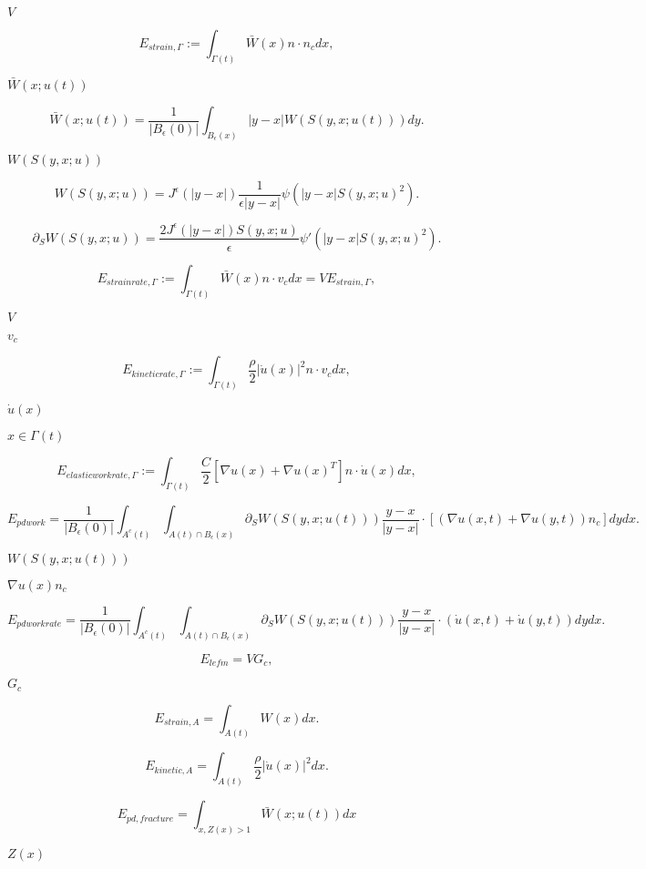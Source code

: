 \documentclass{article}
\begin{document}
$V $
\pagebreak

\[ E_{strain, \Gamma} := \int_{\Gamma(t)} \bar{W}(x) n \cdot n_c dx, \]
\pagebreak

$ \bar{W}(x;u(t)) $
\pagebreak

\[ \bar{W}(x;u(t)) = \frac{1}{|B_\epsilon(0)|} \int_{B_\epsilon(x)} |y-x| W(S(y,x;u(t))) dy.\]
\pagebreak

$ W(S(y,x;u)) $
\pagebreak

\[ W(S(y,x;u)) = J^\epsilon(|y-x|) \frac{1}{\epsilon |y-x|} \psi(|y-x| S(y,x;u)^2). \]
\pagebreak

\[\partial_S W(S(y,x;u)) = \frac{2J^\epsilon(|y-x|) S(y,x;u)}{\epsilon} \psi'(|y-x| S(y,x;u)^2). \]
\pagebreak

\[ E_{strain rate, \Gamma} := \int_{\Gamma(t)}\bar{W}(x) n \cdot v_c dx = V E_{strain, \Gamma}, \]
\pagebreak

$ V$
\pagebreak

$ v_c$
\pagebreak

\[ E_{kinetic rate, \Gamma} := \int_{\Gamma(t)} \frac{\rho}{2} |\dot{u}(x)|^2 n \cdot v_c dx, \]
\pagebreak

$ \dot{u}(x)$
\pagebreak

$ x \in \Gamma (t) $
\pagebreak

\[ E_{elastic work rate, \Gamma} := \int_{\Gamma(t)} \frac{C}{2} [\nabla u (x) + \nabla u(x)^T]n \cdot \dot{u}(x) dx , \]
\pagebreak

\[ E_{pd work} = \frac{1}{|B_\epsilon(0)|} \int_{A^c(t)} \int_{A(t) \cap B_\epsilon(x)} \partial_S W(S(y,x; u(t))) \frac{y-x}{|y-x|} \cdot [(\nabla {u}(x,t) + \nabla {u}(y,t)) n_c] dy dx. \]
\pagebreak

$ W(S(y,x; u(t))) $
\pagebreak

$ \nabla u(x) n_c$
\pagebreak

\[ E_{pd work rate} = \frac{1}{|B_\epsilon(0)|} \int_{A^c(t)} \int_{A(t) \cap B_\epsilon(x)} \partial_S W(S(y,x; u(t))) \frac{y-x}{|y-x|} \cdot (\dot{u}(x,t) + \dot{u}(y,t)) dy dx. \]
\pagebreak

\[ E_{lefm} = V G_c, \]
\pagebreak

$ G_c$
\pagebreak

\[ E_{strain, A} = \int_{A(t)} W(x) dx. \]
\pagebreak

\[ E_{kinetic, A} = \int_{A(t)} \frac{\rho}{2} |\dot{u}(x)|^2 dx. \]
\pagebreak

\[ E_{pd,fracture} = \int_{x, Z(x) > 1} \bar{W}(x;u(t)) dx \]
\pagebreak

$ Z(x) $
\pagebreak
\end{document}
